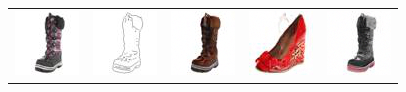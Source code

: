 \begin{figure}[ht]
\begin{center}
\begin{tabular}{ccccc}
        \includegraphics[width=.12\textwidth]{Chapter2/samples/edges-to-shoes/table/2/x.png} &   
        \includegraphics[width=.12\textwidth]{Chapter2/samples/edges-to-shoes/table/2/y.png} &
        \includegraphics[width=.12\textwidth]{Chapter2/samples/edges-to-shoes/table/2/sr3.png} & 
        \includegraphics[width=.12\textwidth]{Chapter2/samples/edges-to-shoes/table/2/Song.png} & 
        \includegraphics[width=.12\textwidth]{Chapter2/samples/edges-to-shoes/table/2/DV.png} \\
        

\end{tabular}
\end{center}
\end{figure}
